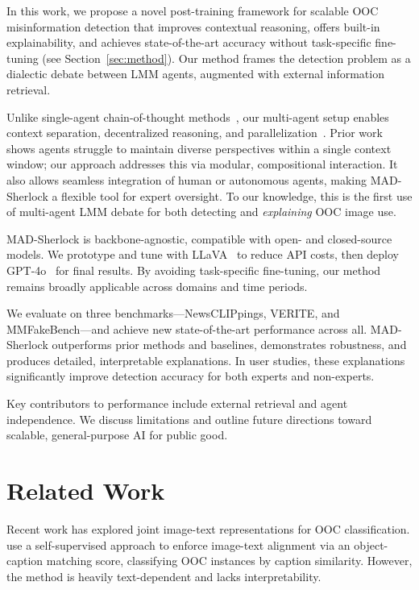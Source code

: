 \documentclass{article}
\theoremstyle{plain}
\theoremstyle{definition}
\theoremstyle{remark}
\newcommand{\frameworkname}{MAD-Sherlock}
\begin{document}
In this work, we propose a novel post-training framework for scalable OOC misinformation detection that improves contextual reasoning, offers built-in explainability, and achieves state-of-the-art accuracy without task-specific fine-tuning (see Section~\ref{sec:method}). Our method frames the detection problem as a dialectic debate between LMM agents, augmented with external information retrieval.

Unlike single-agent chain-of-thought methods~\citep{wei_chain--thought_2024}, our multi-agent setup enables context separation, decentralized reasoning, and parallelization~\citep{de_witt_is_2020,du_improving_2023}. Prior work~\citep{can_llms_keep_a_secret} shows agents struggle to maintain diverse perspectives within a single context window; our approach addresses this via modular, compositional interaction. It also allows seamless integration of human or autonomous agents, making \frameworkname{} a flexible tool for expert oversight. To our knowledge, this is the first use of multi-agent LMM debate for both detecting and \textit{explaining} OOC image use.

\frameworkname{} is backbone-agnostic, compatible with open- and closed-source models. We prototype and tune with LLaVA~\citep{liu2024llavanext} to reduce API costs, then deploy GPT-4o~\citep{gpt4o} for final results. By avoiding task-specific fine-tuning, our method remains broadly applicable across domains and time periods.

We evaluate on three benchmarks—NewsCLIPpings, VERITE, and MMFakeBench—and achieve new state-of-the-art performance across all. \frameworkname{} outperforms prior methods and baselines, demonstrates robustness, and produces detailed, interpretable explanations. In user studies, these explanations significantly improve detection accuracy for both experts and non-experts.

Key contributors to performance include external retrieval and agent independence. We discuss limitations and outline future directions toward scalable, general-purpose AI for public good.


\section{Related Work}

Recent work has explored joint image-text representations for OOC classification. \citet{aneja2022acmmultimediagrandchallenge} use a self-supervised approach to enforce image-text alignment via an object-caption matching score, classifying OOC instances by caption similarity. However, the method is heavily text-dependent and lacks interpretability.
\end{document}
